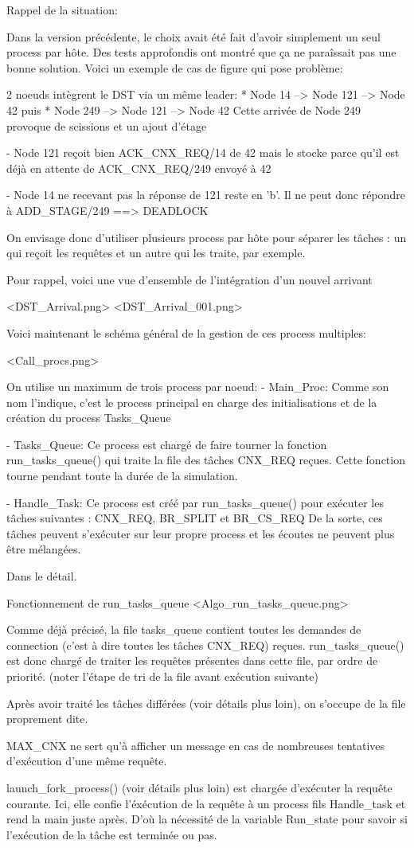 Rappel de la situation:

Dans la version précédente, le choix avait été fait d'avoir simplement un seul
process par hôte. Des tests approfondis ont montré que ça ne paraîssait pas une
bonne solution. Voici un exemple de cas de figure qui pose problème:

2 noeuds intègrent le DST via un même leader:
 * Node 14 --> Node 121 --> Node 42
   puis
 * Node 249 --> Node 121 --> Node 42
   Cette arrivée de Node 249 provoque de scissions et un ajout d'étage

 - Node 121 reçoit bien ACK_CNX_REQ/14 de 42 mais le stocke parce qu'il est
   déjà en attente de ACK_CNX_REQ/249 envoyé à 42

 - Node 14 ne recevant pas la réponse de 121 reste en 'b'. Il ne peut donc
   répondre à ADD_STAGE/249 ==> DEADLOCK

On envisage donc d'utiliser plusieurs process par hôte pour séparer les tâches :
un qui reçoit les requêtes et un autre qui les traite, par exemple.

Pour rappel, voici une vue d'ensemble de l'intégration d'un nouvel arrivant

<DST_Arrival.png>
<DST_Arrival_001.png>

Voici maintenant le schéma général de la gestion de ces process multiples:

<Call_procs.png>

On utilise un maximum de trois process par noeud:
    - Main_Proc:
      Comme son nom l'indique, c'est le process principal en charge des
      initialisations et de la création du process Tasks_Queue

    - Tasks_Queue:
      Ce process est chargé de faire tourner la fonction run_tasks_queue() qui
      traite la file des tâches CNX_REQ reçues. Cette fonction tourne pendant
      toute la durée de la simulation.

    - Handle_Task:
      Ce process est créé par run_tasks_queue() pour exécuter les tâches
      suivantes : CNX_REQ, BR_SPLIT et BR_CS_REQ
      De la sorte, ces tâches peuvent s'exécuter sur leur propre process et les
      écoutes ne peuvent plus être mélangées.


Dans le détail.

Fonctionnement de run_tasks_queue
<Algo_run_tasks_queue.png>

Comme déjà précisé, la file tasks_queue contient toutes les demandes de
connection (c'est à dire toutes les tâches CNX_REQ) reçues. run_tasks_queue()
est donc chargé de traiter les requêtes présentes dans cette file, par ordre de
priorité. (noter l'étape de tri de la file avant exécution suivante)

Après avoir traité les tâches différées (voir détails plus loin), on s'occupe de
la file proprement dite.

MAX_CNX ne sert qu'à afficher un message en cas de nombreuses tentatives
d'exécution d'une même requête.

launch_fork_process() (voir détails plus loin) est chargée d'exécuter la
requête courante. Ici, elle confie l'éxécution de la requête à un process fils
Handle_task et rend la main juste après. D'où la nécessité de la variable
Run_state pour savoir si l'exécution de la tâche est terminée ou pas.
